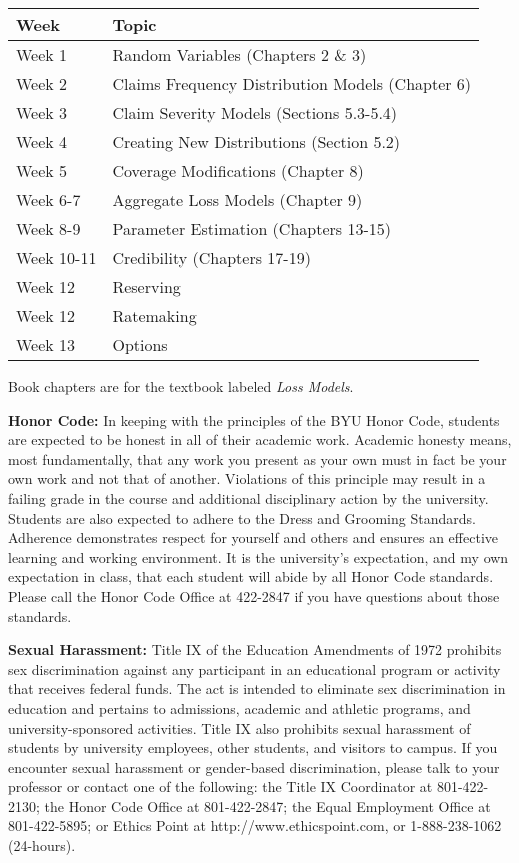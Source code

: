 \documentclass[12pt]{article}
\begin{document}
\begin{tabular}{ | m{3cm} | m{12cm} | }
\hline
\rowcolor{gray!25}
\textbf{Week} & \textbf{Topic} \\
\hline
Week 1 & Random Variables (Chapters 2 \& 3)  \\
\hline
Week 2 & Claims Frequency Distribution Models (Chapter 6)  \\
\hline
Week 3 &  Claim Severity Models (Sections 5.3-5.4)  \\
\hline
Week 4 & Creating New Distributions (Section 5.2)  \\
\hline
Week 5 & Coverage Modifications (Chapter 8)  \\
\hline
Week 6-7 & Aggregate Loss Models (Chapter 9)  \\
\hline
Week 8-9 & Parameter Estimation (Chapters 13-15)  \\
\hline
Week 10-11 & Credibility (Chapters 17-19)  \\
\hline
Week 12 & Reserving \\
\hline
Week 12 &  Ratemaking \\
\hline
Week 13 & Options \\
\hline
\end{tabular}

Book chapters are for the textbook labeled \emph{Loss Models}. 

\vspace{1 cm}

\textbf {\large Honor Code:} 
In keeping with the principles of the BYU Honor Code, students are expected to be honest in all of their academic work. Academic honesty means, most fundamentally, that any work you present as your own must in fact be your own work and not that of another. Violations of this principle may result in a failing grade in the course and additional disciplinary action by the university. Students are also expected to adhere to the Dress and Grooming Standards. Adherence demonstrates respect for yourself and others and ensures an effective learning and working environment. It is the university's expectation, and my own expectation in class, that each student will abide by all Honor Code standards. Please call the Honor Code Office at 422-2847 if you have questions about those standards.

\vspace{.5 cm}


\textbf {\large Sexual Harassment:} 
Title IX of the Education Amendments of 1972 prohibits sex discrimination against any participant in an educational program or activity that receives federal funds. The act is intended to eliminate sex discrimination in education and pertains to admissions, academic and athletic programs, and university-sponsored activities. Title IX also prohibits sexual harassment of students by university employees, other students, and visitors to campus. If you encounter sexual harassment or gender-based discrimination, please talk to your professor or contact one of the following: the Title IX Coordinator at 801-422-2130; the Honor Code Office at 801-422-2847; the Equal Employment Office at 801-422-5895; or Ethics Point at http://www.ethicspoint.com, or 1-888-238-1062 (24-hours).
\end{document}
